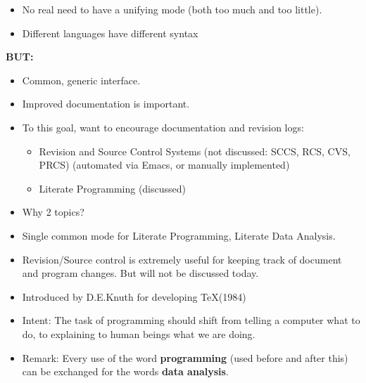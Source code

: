 \documentclass[semhelv]{seminar}
\begin{document}
\begin{slide}

  \begin{itemize}
  \item No real need to have a unifying mode (both too much and too
    little). 
  \item Different languages have different syntax
  \end{itemize}
  \textbf{BUT:}
  \begin{itemize}
  \item Common, generic interface.
  \item Improved documentation is important.
  \item To this goal, want to encourage documentation and revision
    logs:
    \begin{itemize}
    \item Revision and Source Control Systems (not discussed: SCCS,
      RCS, CVS, PRCS) (automated via Emacs, or manually implemented)
    \item Literate Programming (discussed)
    \end{itemize}
  \end{itemize}
\end{slide}

\begin{itemize}
\item Why 2 topics?
\item Single common mode for Literate Programming, Literate Data
  Analysis.
\item Revision/Source control is extremely useful for keeping track of
  document and program changes.  But will not be discussed today.
\end{itemize}

\begin{slide}

  \begin{itemize}
  \item Introduced by D.E.Knuth for developing \TeX (1984)
  \item Intent: The task of programming should shift from telling a
    computer what to do, to explaining to human beings what we are
    doing.
  \item Remark: Every use of the word \textbf{programming} (used
    before and after this) can be exchanged for the words \textbf{data
      analysis}.
  \end{itemize}
\end{slide}
\end{document}
